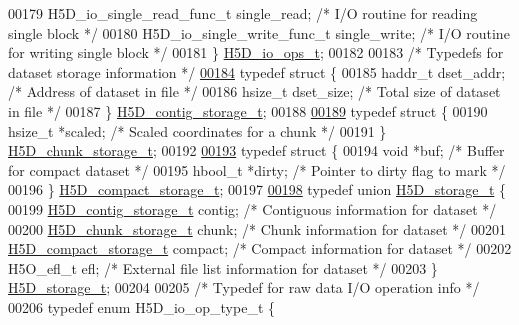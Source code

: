 \begin{DoxyCode}
00179     H5D\_io\_single\_read\_func\_t single\_read;      \textcolor{comment}{/* I/O routine for reading single block */}
00180     H5D\_io\_single\_write\_func\_t single\_write;    \textcolor{comment}{/* I/O routine for writing single block */}
00181 \} \hyperlink{struct_h5_d__io__ops__t}{H5D\_io\_ops\_t};
00182 
00183 \textcolor{comment}{/* Typedefs for dataset storage information */}
\hyperlink{struct_h5_d__contig__storage__t}{00184} \textcolor{keyword}{typedef} \textcolor{keyword}{struct }\{
00185     haddr\_t dset\_addr;      \textcolor{comment}{/* Address of dataset in file */}
00186     hsize\_t dset\_size;      \textcolor{comment}{/* Total size of dataset in file */}
00187 \} \hyperlink{struct_h5_d__contig__storage__t}{H5D\_contig\_storage\_t};
00188 
\hyperlink{struct_h5_d__chunk__storage__t}{00189} \textcolor{keyword}{typedef} \textcolor{keyword}{struct }\{
00190     hsize\_t *scaled;        \textcolor{comment}{/* Scaled coordinates for a chunk */}
00191 \} \hyperlink{struct_h5_d__chunk__storage__t}{H5D\_chunk\_storage\_t};
00192 
\hyperlink{struct_h5_d__compact__storage__t}{00193} \textcolor{keyword}{typedef} \textcolor{keyword}{struct }\{
00194     \textcolor{keywordtype}{void} *buf;              \textcolor{comment}{/* Buffer for compact dataset */}
00195     hbool\_t *dirty;         \textcolor{comment}{/* Pointer to dirty flag to mark */}
00196 \} \hyperlink{struct_h5_d__compact__storage__t}{H5D\_compact\_storage\_t};
00197 
\hyperlink{union_h5_d__storage__t}{00198} \textcolor{keyword}{typedef} \textcolor{keyword}{union }\hyperlink{union_h5_d__storage__t}{H5D\_storage\_t} \{
00199     \hyperlink{struct_h5_d__contig__storage__t}{H5D\_contig\_storage\_t} contig; \textcolor{comment}{/* Contiguous information for dataset */}
00200     \hyperlink{struct_h5_d__chunk__storage__t}{H5D\_chunk\_storage\_t} chunk;  \textcolor{comment}{/* Chunk information for dataset */}
00201     \hyperlink{struct_h5_d__compact__storage__t}{H5D\_compact\_storage\_t} compact; \textcolor{comment}{/* Compact information for dataset */}
00202     H5O\_efl\_t   efl;            \textcolor{comment}{/* External file list information for dataset */}
00203 \} \hyperlink{union_h5_d__storage__t}{H5D\_storage\_t};
00204 
00205 \textcolor{comment}{/* Typedef for raw data I/O operation info */}
00206 \textcolor{keyword}{typedef} \textcolor{keyword}{enum} H5D\_io\_op\_type\_t \{

\end{DoxyCode}
